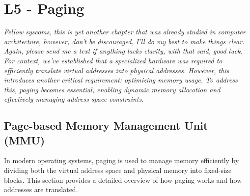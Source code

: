 \documentclass[../../compsys.tex]{subfiles}
\begin{document}
\chapter{L5 - Paging}
\textit{Fellow syscoms, this is yet another chapter that was already studied in computer architecture, however, don't be discouraged, I'll do my best to make things clear. Again, please send me a text if anything lacks clarity, with that said, good luck.}\\[5px]
\textit{For context, we've established that a specialized hardware was required to efficiently translate virtual addresses into physical addresses. However, this introduces another critical requirement: optimizing memory usage. To address this, paging becomes essential, enabling dynamic memory allocation and effectively managing address space constraints.}
\vfill
\section{Page-based Memory Management Unit (MMU)}
In modern operating systems, paging is used to manage memory efficiently by dividing both the virtual address space and physical memory into fixed-size blocks. This section provides a detailed overview of how paging works and how addresses are translated.
\end{document}

